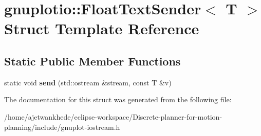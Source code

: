 \hypertarget{structgnuplotio_1_1FloatTextSender}{}\section{gnuplotio\+:\+:Float\+Text\+Sender$<$ T $>$ Struct Template Reference}
\label{structgnuplotio_1_1FloatTextSender}
\subsection*{Static Public Member Functions}
\begin{DoxyCompactItemize}
\item 
\mbox{\label{structgnuplotio_1_1FloatTextSender_aed6b6c3a95b1396688800d6d1f2fc299}} 
static void {\bfseries send} (std\+::ostream \&stream, const T \&v)
\end{DoxyCompactItemize}


The documentation for this struct was generated from the following file\+:\begin{DoxyCompactItemize}
\item 
/home/ajetwankhede/eclipse-\/workspace/\+Discrete-\/planner-\/for-\/motion-\/planning/include/gnuplot-\/iostream.\+h\end{DoxyCompactItemize}
